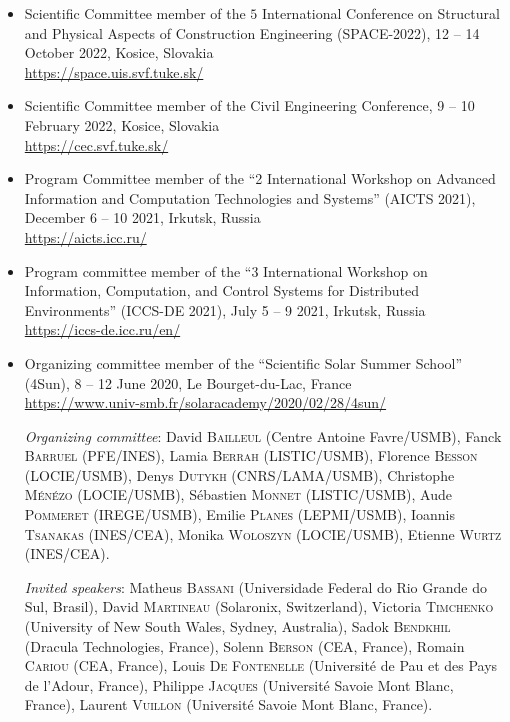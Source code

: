 \documentclass[final, a4paper, oneside, 12pt]{article}
\numberwithin{equation}{section}
\begin{document}
\begin{itemize}

  \item Scientific Committee member of the $5$ International Conference on Structural and Physical Aspects of Construction Engineering (SPACE-2022), 12 -- 14 October 2022, Kosice, Slovakia \\
  \url{https://space.uis.svf.tuke.sk/}

  \item Scientific Committee member of the Civil Engineering Conference, 9 -- 10 February 2022, Kosice, Slovakia \\
  \url{https://cec.svf.tuke.sk/}
  
  \item Program Committee member of the ``2 International Workshop on Advanced Information and Computation Technologies and Systems'' (AICTS 2021), December 6 -- 10 2021, Irkutsk, Russia \\
  \url{https://aicts.icc.ru/}

  \item Program committee member of the ``3 International Workshop on Information, Computation, and Control Systems for Distributed Environments'' (ICCS-DE 2021), July 5 -- 9 2021, Irkutsk, Russia \\
  \url{https://iccs-de.icc.ru/en/}

  \item Organizing committee member of the ``Scientific Solar Summer School'' (4Sun), 8 -- 12 June 2020, Le Bourget-du-Lac, France \\
  \url{https://www.univ-smb.fr/solaracademy/2020/02/28/4sun/}
  
  \textit{Organizing committee}: David \textsc{Bailleul} (Centre Antoine Favre/USMB), Fanck \textsc{Barruel} (PFE/INES), Lamia \textsc{Berrah} (LISTIC/USMB), Florence \textsc{Besson} (LOCIE/USMB), Denys \textsc{Dutykh} (CNRS/LAMA/USMB), Christophe \textsc{M\'en\'ezo} (LOCIE/USMB), S\'ebastien \textsc{Monnet} (LISTIC/USMB), Aude \textsc{Pommeret} (IREGE/USMB), Emilie \textsc{Planes} (LEPMI/USMB), Ioannis \textsc{Tsanakas} (INES/CEA), Monika \textsc{Woloszyn} (LOCIE/USMB), Etienne \textsc{Wurtz} (INES/CEA).
  
  \textit{Invited speakers}: Matheus \textsc{Bassani} (Universidade Federal do Rio Grande do Sul, Brasil), David \textsc{Martineau} (Solaronix, Switzerland), Victoria \textsc{Timchenko} (University of New South Wales, Sydney, Australia), Sadok \textsc{Bendkhil} (Dracula Technologies, France), Solenn \textsc{Berson} (CEA, France), Romain \textsc{Cariou} (CEA, France), Louis \textsc{De Fontenelle} (Universit\'e de Pau et des Pays de l'Adour, France), Philippe \textsc{Jacques} (Universit\'e Savoie Mont Blanc, France), Laurent \textsc{Vuillon} (Universit\'e Savoie Mont Blanc, France).
  

\end{itemize}
\end{document}
